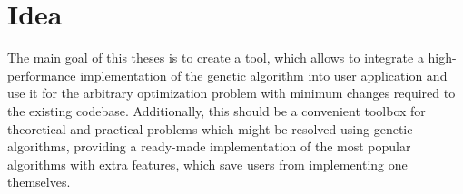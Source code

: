 \section{Idea}

The main goal of this theses is to create a tool, which allows to integrate a high-performance implementation of the genetic algorithm into user application and use it for the arbitrary optimization problem with minimum changes required to the existing codebase. Additionally, this should be a convenient toolbox for theoretical and practical problems which might be resolved using genetic algorithms, providing a ready-made implementation of the most popular algorithms with extra features, which save users from implementing one themselves.